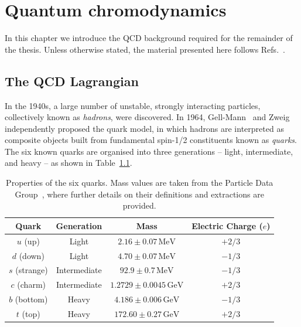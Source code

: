\chapter{Quantum chromodynamics}
\label{ch:QCD}

In this chapter we introduce the QCD background required for the remainder of
the thesis. Unless otherwise stated, the material presented here 
follows Refs.~\cite{Ellis:1996mzs, Campbell:2017hsr, Peskin:1995ev,
Luisoni:2015xha, Schwartz:2014sze, Banfi:2016yyq}.

\section{The QCD Lagrangian}
\label{sec:qCD-lang}

In the 1940s, a large number of unstable, strongly interacting particles,
collectively known as \emph{hadrons}, were discovered. In 1964, 
Gell-Mann~\cite{Gell-Mann:1964ewy} and Zweig~\cite{Zweig:1964ruk, Zweig:1964jf} 
independently proposed the quark model, in which hadrons are interpreted as composite objects built from 
fundamental spin-1/2 constituents known as \emph{quarks}. The six known quarks are organised into three generations -- light, intermediate, and heavy -- as shown in Table~\ref{table:quark-properties}.
 \begin{table}[h!]
\centering
\begin{tabular}{|c|c|c|c|}
\hline
Quark & Generation & Mass & Electric Charge ($e$) \\ \hline

$u$ (up)   & Light        & $2.16 \pm 0.07\,\mathrm{MeV}$ & $+2/3$ \\ \hline
$d$ (down) & Light        & $4.70 \pm 0.07\,\mathrm{MeV}$ & $-1/3$ \\ \hline

$s$ (strange) & Intermediate & $92.9 \pm 0.7\,\mathrm{MeV}$ & $-1/3$ \\ \hline
$c$ (charm)   & Intermediate & $1.2729 \pm 0.0045\,\mathrm{GeV}$ & $+2/3$ \\ \hline

$b$ (bottom) & Heavy & $4.186 \pm 0.006\,\mathrm{GeV}$ & $-1/3$ \\ \hline
$t$ (top)    & Heavy & $172.60 \pm 0.27\,\mathrm{GeV}$ & $+2/3$ \\ \hline

\end{tabular}
\caption{Properties of the six quarks. Mass values are taken from the Particle Data Group~\cite{ParticleDataGroup:2026aaa}, 
where further details on their definitions and extractions are provided.}
\label{table:quark-properties}
\end{table}

